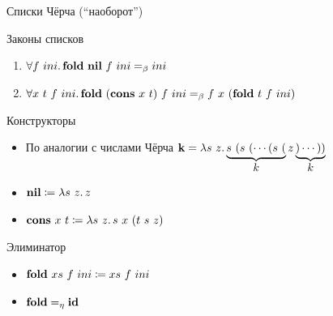     \begin{frame}[fragile]{Списки Чёрча (``наоборот'')}
        \begin{block}{Законы списков}
            \begin{enumerate}
                \item $\forall f~ini\ldotp \mathbf{fold} ~ \mathbf{nil} ~ f ~ ini =_\beta ini$
                \item $\forall x~t~f~ini\ldotp \mathbf{fold} ~ (\mathbf{cons} ~ x ~ t) ~ f ~ ini =_\beta f ~ x ~ (\mathbf{fold} ~ t ~ f ~ ini)$
            \end{enumerate}
        \end{block}
        \pause
        \begin{block}{Конструкторы}
            \begin{itemize}
                \item По аналогии с числами Чёрча $\mathbf{k} = \lambda s~z\ldotp \underbrace{s~(s~(\cdots (s~(}_{\textstyle k} z\underbrace{)\cdots ))}_{\textstyle k}$
                \item $\mathbf{nil} \coloneqq \lambda s~z \ldotp z$
                \item $\mathbf{cons} ~ x ~ t \coloneqq \lambda s~z\ldotp s~x~(t~s~z)$
            \end{itemize}
        \end{block}
        \pause
        \begin{block}{Элиминатор}
            \begin{itemize}
                \item $\mathbf{fold} ~ xs ~ f ~ ini \coloneqq xs ~ f ~ ini$
                \item $\mathbf{fold} =_\eta \mathbf{id}$
            \end{itemize}
        \end{block}
    \end{frame}

